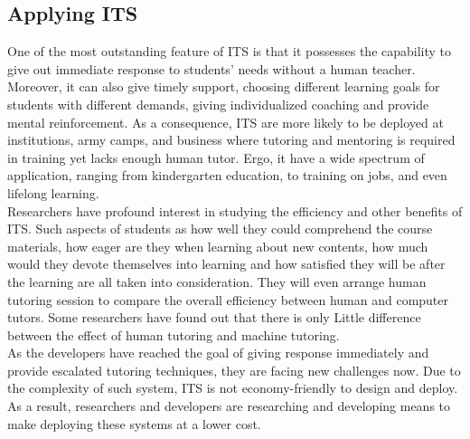 \documentclass[sigconf]{acmart}
\begin{document}
\subsection{Applying ITS}
One of the most outstanding feature of ITS is that it possesses the capability to give out immediate response to students' needs without a human teacher. Moreover, it can also give timely support, choosing different learning goals for students with different demands, giving individualized coaching and provide mental reinforcement. As a consequence, ITS are more likely to be deployed at institutions, army camps, and business where tutoring and mentoring is required in training yet lacks enough human tutor. Ergo, it have a wide spectrum of application, ranging from kindergarten education, to training on jobs, and even lifelong learning.\\
Researchers have profound interest in studying the efficiency and other benefits of ITS. Such aspects of students as how well they could comprehend the course materials, how eager are they when learning about new contents, how much would they devote themselves into learning and how satisfied they will be after the learning are all taken into consideration. They will even arrange human tutoring session to compare the overall efficiency between human and computer tutors. Some researchers have found out that there is only Little difference between the effect of human tutoring and machine tutoring\cite{Gunn2013}.\\
As the developers have reached the goal of giving response immediately and provide escalated tutoring techniques, they are facing new challenges now. Due to the complexity of such system, ITS is not economy-friendly to design and deploy. As a result, researchers and developers are researching and developing means to make deploying these systems at a lower cost.\\
\end{document}
